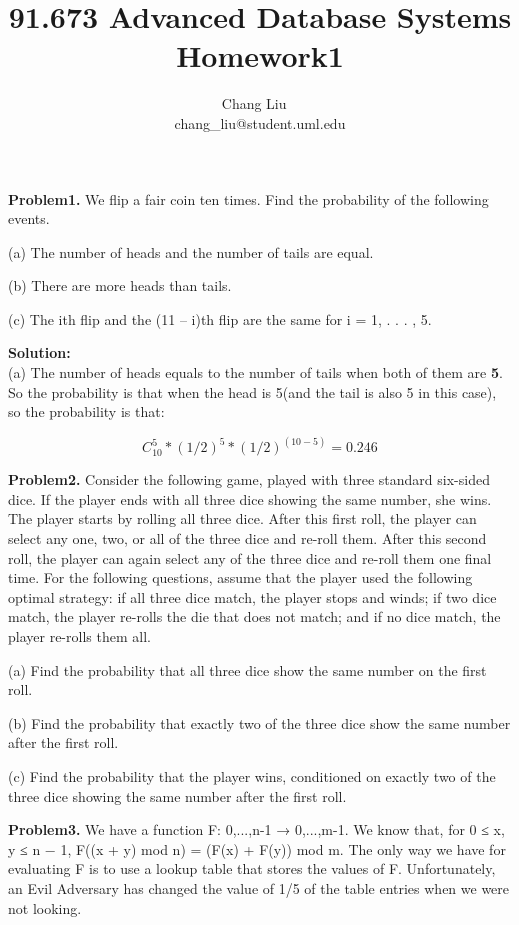\documentclass{article}
\author{Chang Liu ~\\ chang\_liu@student.uml.edu}
\title{91.673 Advanced Database Systems Homework1}
\begin{document}
\maketitle



\noindent \textbf{Problem1.} We flip a fair coin ten times. Find the probability of the following events.

(a) The number of heads and the number of tails are equal.

(b) There are more heads than tails.

(c) The ith flip and the (11 – i)th flip are the same for i = 1, . . . , 5. 

\textbf{Solution:}~\\

(a) The number of heads equals to the number of tails when both of them are \textbf{5}. So the probability is that when the head is 5(and the tail is also 5 in this case), so the probability is that:

$$C_{10}^5 * (1/2)^5 * (1/2)^{(10-5)} = 0.246$$



\noindent \textbf{Problem2.} Consider the following game, played with three standard six-sided dice. If the player ends
with all three dice showing the same number, she wins. The player starts by rolling all three dice. After
this first roll, the player can select any one, two, or all of the three dice and re-roll them. After this second
roll, the player can again select any of the three dice and re-roll them one final time. For the following
questions, assume that the player used the following optimal strategy: if all three dice match, the player
stops and winds; if two dice match, the player re-rolls the die that does not match; and if no dice match,
the player re-rolls them all.

(a) Find the probability that all three dice show the same number on the first roll.

(b) Find the probability that exactly two of the three dice show the same number after the first roll.

(c) Find the probability that the player wins, conditioned on exactly two of the three dice showing the
same number after the first roll.
 

\noindent \textbf{Problem3.} We have a function F: {0,...,n-1} → {0,...,m-1}. We know that, for 0 ≤ x, y ≤ n − 1, F((x +
y) mod n) = (F(x) + F(y)) mod m. The only way we have for evaluating F is to use a lookup table that
stores the values of F. Unfortunately, an Evil Adversary has changed the value of 1/5 of the table entries
when we were not looking.
\end{document}
